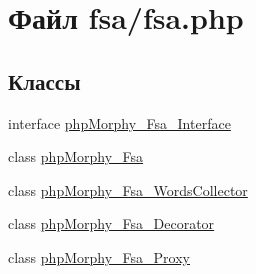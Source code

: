 \hypertarget{fsa_8php}{
\section{Файл fsa/fsa.php}
\label{fsa_8php}
}
\subsection*{Классы}
\begin{DoxyCompactItemize}
\item 
interface \hyperlink{interfacephpMorphy__Fsa__Interface}{phpMorphy\_\-Fsa\_\-Interface}
\item 
class \hyperlink{classphpMorphy__Fsa}{phpMorphy\_\-Fsa}
\item 
class \hyperlink{classphpMorphy__Fsa__WordsCollector}{phpMorphy\_\-Fsa\_\-WordsCollector}
\item 
class \hyperlink{classphpMorphy__Fsa__Decorator}{phpMorphy\_\-Fsa\_\-Decorator}
\item 
class \hyperlink{classphpMorphy__Fsa__Proxy}{phpMorphy\_\-Fsa\_\-Proxy}
\end{DoxyCompactItemize}
